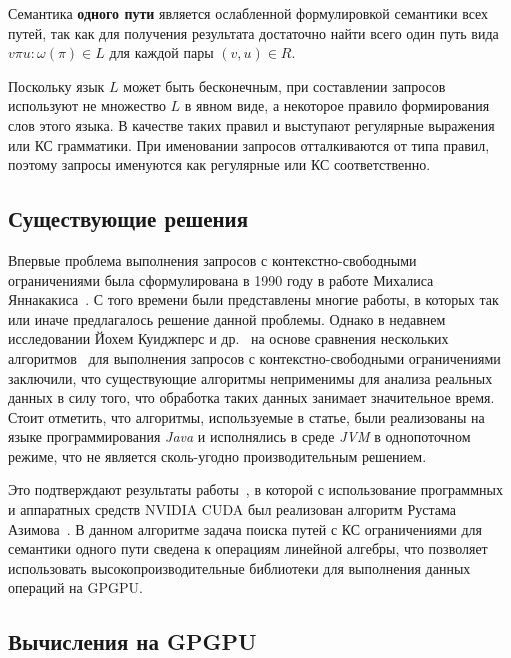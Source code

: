 \documentclass[14pt]{matmex-diploma-custom}
\begin{document}
Семантика \textbf{одного пути} является ослабленной формулировкой семантики всех путей, так как для получения результата достаточно найти всего один путь вида $v \pi u : \omega (\pi) \in L$ для каждой пары $(v, u) \in R$.

Поскольку язык $L$ может быть бесконечным, при составлении запросов используют не множество $L$ в явном виде, а некоторое правило формирования слов этого языка. В качестве таких правил и выступают регулярные выражения или КС грамматики. При именовании запросов отталкиваются от типа правил, поэтому запросы именуются как регулярные или КС соответственно.

\subsection{Существующие решения}

Впервые проблема выполнения запросов с контекстно-свободными ограничениями была сформулирована в 1990 году в работе Михалиса Яннакакиса~\cite{inproceedings:yannakakis_cfpq_problem}. С того времени были представлены многие работы, в которых так или иначе предлагалось решение данной проблемы. Однако в недавнем исследовании Йохем Куиджперс и др.~\cite{article:kuijpers_cfpq_exp_compare} на основе сравнения нескольких алгоритмов~\cite{article:hellings_cfpq,inproceedings:matrix_cfpq,inbook:santos_cfpq_lr_analysis} для выполнения запросов с контекстно-свободными ограничениями заключили, что существующие алгоритмы неприменимы для анализа реальных данных в силу того, что обработка таких данных занимает значительное время. Стоит отметить, что алгоритмы, используемые в статье, были реализованы на языке программирования \textit{Java} и исполнялись в среде \textit{JVM} в однопоточном режиме, что не является сколь-угодно производительным решением.

Это подтверждают результаты работы~\cite{inproceedings:cfqp_matrix_with_single_source}, в которой с использование программных и аппаратных средств NVIDIA CUDA был реализован алгоритм Рустама Азимова~\cite{inproceedings:matrix_cfpq}. В данном алгоритме задача поиска путей с КС ограничениями для семантики одного пути сведена к операциям линейной алгебры, что позволяет использовать высокопроизводительные библиотеки для выполнения данных операций на GPGPU.

\subsection{Вычисления на GPGPU}
\end{document}
